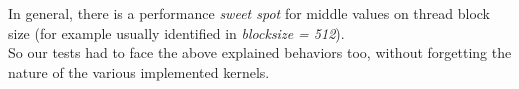 	In general, there is a performance \textit{sweet spot} for middle values on thread block size (for example usually identified in \textit{blocksize = 512}).\\
	So our tests had to face the above explained behaviors too, without forgetting the nature of the various implemented kernels.


%



